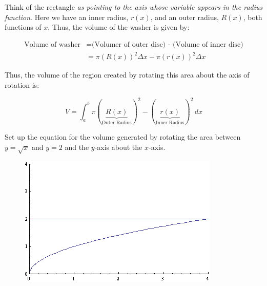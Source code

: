 \documentclass[10pt]{article}
\begin{document}
\begin{enumerate}
    Think of the rectangle \textit{as pointing to the axis whose variable appears in the radius function}. Here we have an inner
    radius, $r(x)$, and an outer radius, $R(x)$, both functions of $x$. Thus, the volume of the washer is given by:

    \begin{align*}
        \text{Volume of washer} & = \text{(Volumer of outer disc) - (Volume of inner disc)} \\
        & = \pi(R(x))^2\Delta x - \pi(r(x))^2\Delta x
    \end{align*}

    Thus, the volume of the region created by rotating this area about the axis of rotation is:

    \[
        V = \int_a^b \pi(\underbrace{R(x)}_{\text{Outer Radius}})^2 - (\underbrace{r(x)}_{\text{Inner Radius}})^2\,dx
    \]

    Set up the equation for the volume generated by rotating the area between $y = \sqrt{x}$ and $y = 2$ and the $y$-axis about
    the $x$-axis.
    \begin{figure}[h!]
        \includegraphics[scale=.35]{sxy.png}
    \end{figure}

\end{enumerate}
\end{document}

